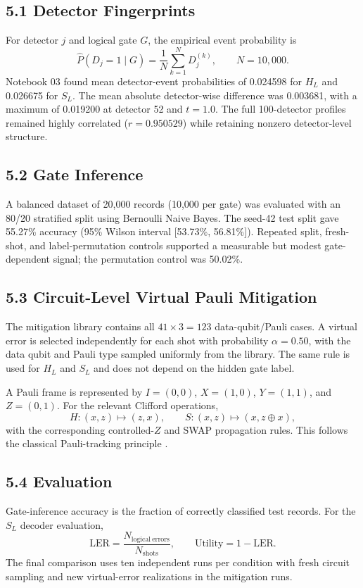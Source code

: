 \documentclass[9pt,a4paper]{article}
\newcommand{\HL}{\ensuremath{H_L}}
\newcommand{\SL}{\ensuremath{S_L}}
\newcommand{\LER}{\ensuremath{\mathrm{LER}}}
\newcommand{\Utility}{\ensuremath{\mathrm{Utility}}}
\begin{document}
\subsection*{5.1 Detector Fingerprints}
For detector $j$ and logical gate $G$, the empirical event probability is
\[
\widehat P(D_j=1\mid G)=\frac{1}{N}\sum_{k=1}^{N}D_j^{(k)},\qquad N=10{,}000.
\]
Notebook 03 found mean detector-event probabilities of 0.024598 for \HL{} and 0.026675 for \SL{}. The mean absolute detector-wise difference was 0.003681, with a maximum of 0.019200 at detector 52 and $t=1.0$. The full 100-detector profiles remained highly correlated ($r=0.950529$) while retaining nonzero detector-level structure.

\subsection*{5.2 Gate Inference}
A balanced dataset of 20,000 records (10,000 per gate) was evaluated with an 80/20 stratified split using Bernoulli Naive Bayes. The seed-42 test split gave 55.27\% accuracy (95\% Wilson interval [53.73\%, 56.81\%]). Repeated split, fresh-shot, and label-permutation controls supported a measurable but modest gate-dependent signal; the permutation control was 50.02\%.

\subsection*{5.3 Circuit-Level Virtual Pauli Mitigation}
The mitigation library contains all $41\times3=123$ data-qubit/Pauli cases. A virtual error is selected independently for each shot with probability $\alpha=0.50$, with the data qubit and Pauli type sampled uniformly from the library. The same rule is used for \HL{} and \SL{} and does not depend on the hidden gate label.

A Pauli frame is represented by $I=(0,0)$, $X=(1,0)$, $Y=(1,1)$, and $Z=(0,1)$. For the relevant Clifford operations,
\[
H:(x,z)\mapsto(z,x),\qquad S:(x,z)\mapsto(x,z\oplus x),
\]
with the corresponding controlled-$Z$ and SWAP propagation rules. This follows the classical Pauli-tracking principle \cite{reichardt2006}.

\subsection*{5.4 Evaluation}
Gate-inference accuracy is the fraction of correctly classified test records. For the \SL{} decoder evaluation,
\[
\LER=\frac{N_{\mathrm{logical\ errors}}}{N_{\mathrm{shots}}},\qquad \Utility=1-\LER.
\]
The final comparison uses ten independent runs per condition with fresh circuit sampling and new virtual-error realizations in the mitigation runs.
\end{document}
